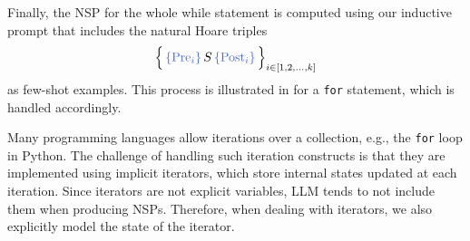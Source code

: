 \documentclass[sigconf]{acmart}
\makeatletter
\def\mathcolor#1#{\@mathcolor{#1}}
\def\@mathcolor#1#2#3{%
  \protect\leavevmode
  \begingroup
    \color#1{#2}#3%
  \endgroup
}
\makeatother
\begin{document}
Finally, the NSP for the whole while statement is computed using our inductive prompt that includes the natural Hoare triples $$\Bigl\{\,\mathcolor{softblue}{\{\text{Pre}_i\}}  \, S \, \mathcolor{softblue}{\{\text{Post}_i\}}\,\Bigr\}_{i\in[1,2,...,k]}$$ as few-shot examples. This process is illustrated in  for a \texttt{for} statement, which is handled accordingly.


Many programming languages allow iterations over a collection, e.g., the {\tt for} loop in Python. 
The challenge of handling such iteration constructs is that they are implemented using implicit iterators, which store internal states updated at each iteration. Since iterators are not explicit variables, LLM tends to not include them when producing NSPs. Therefore, when dealing with iterators, we also explicitly model the state of the iterator.
\end{document}
